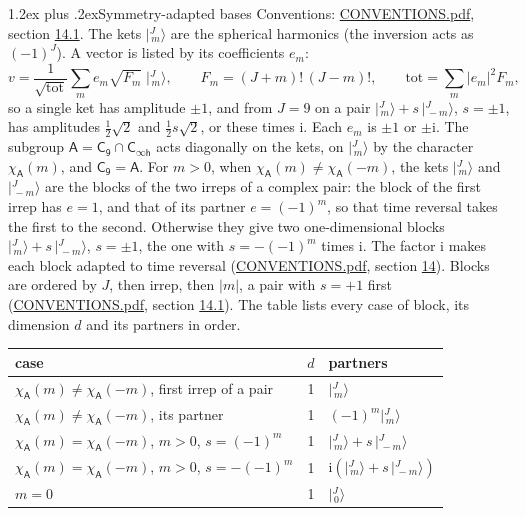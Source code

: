 \documentclass[10pt,a4paper]{article}
\makeatletter
\renewcommand\section{\@startsection{section}{1}{\z@}{-3ex plus -1ex minus -.2ex}%
  {1.2ex plus .2ex}{\normalfont\large\sffamily\bfseries\color{parttitle}}}
\numberwithin{equation}{section}
\newcommand{\grp}[1]{\mathsf{#1}}
\newcommand{\iunit}{\mathrm{i}}
\newcommand{\chiA}{\chi_{\grp{A}}}
\newcommand{\jm}[2]{\bigl\lvert{}^{#1}_{\,#2}\bigr\rangle}
\makeatother
\begin{document}
\section{Symmetry-adapted bases}\label{s:bases}
Conventions: \href{../../CONVENTIONS.pdf}{CONVENTIONS.pdf}, section \href{../../CONVENTIONS.pdf\#conv.14.1}{14.1}.
\leavevmode\label{n:index.m}\label{n:vector.ket}The kets $\jm{J}{m}$ are the spherical harmonics (the inversion acts as $(-1)^J$). \label{n:index.ketcoefficient}\label{n:vector.basis.symmetry}\label{n:index.ketweight}\label{n:index.total}A vector is listed by its coefficients $e_m$:
\begin{equation}\label{e:ket}v = \frac{1}{\sqrt{\mathrm{tot}}}\sum_m e_m\sqrt{F_m}\;\jm{J}{m},\qquad F_m = (J+m)!\,(J-m)!,\qquad \mathrm{tot} = \sum_m |e_m|^2F_m,\end{equation}
\leavevmode\label{n:index.pair.sign}so a single ket has amplitude $\pm1$, and from $J = 9$ on a pair $\jm{J}{m} + s\,\jm{J}{-m}$, $s = \pm1$, has amplitudes $\tfrac{1}{2}\sqrt{2}$ and $\tfrac{1}{2}s\sqrt{2}$, or these times $\iunit$. Each $e_m$ is $\pm1$ or $\pm\iunit$.
\leavevmode\label{n:group.A}\label{n:function.character.abelian}The subgroup $\grp{A} = \grp{C_{9}}\cap\grp{C_{\infty h}}$ acts diagonally on the kets, on $\jm{J}{m}$ by the character $\chiA(m)$, and $\grp{C_{9}} = \grp{A}$. For $m > 0$, when $\chiA(m) \ne \chiA(-m)$, the kets $\jm{J}{m}$ and $\jm{J}{-m}$ are the blocks of the two irreps of a complex pair: the block of the first irrep has $e = 1$, and that of its partner $e = (-1)^m$, so that time reversal takes the first to the second. Otherwise they give two one-dimensional blocks $\jm{J}{m} + s\,\jm{J}{-m}$, $s = \pm1$, the one with $s = -(-1)^m$ times $\iunit$. The factor $\iunit$ makes each block adapted to time reversal (\href{../../CONVENTIONS.pdf}{CONVENTIONS.pdf}, section \href{../../CONVENTIONS.pdf\#conv.14}{14}). Blocks are ordered by $J$, then irrep, then $|m|$, a pair with $s = +1$ first (\href{../../CONVENTIONS.pdf}{CONVENTIONS.pdf}, section \href{../../CONVENTIONS.pdf\#conv.14.1}{14.1}).
\leavevmode\label{n:head.case}\label{n:head.partners}The table lists every case of block, its dimension $d$ and its partners in order.
\begin{center}\begin{tabular}{@{}lrl@{}}\toprule
case & $d$ & partners\\\midrule
$\chiA(m) \ne \chiA(-m)$, first irrep of a pair & 1 & $\jm{J}{m}$\\
$\chiA(m) \ne \chiA(-m)$, its partner & 1 & $(-1)^m\jm{J}{m}$\\
$\chiA(m) = \chiA(-m)$, $m > 0$, $s = (-1)^m$ & 1 & $\jm{J}{m} + s\,\jm{J}{-m}$\\
$\chiA(m) = \chiA(-m)$, $m > 0$, $s = -(-1)^m$ & 1 & $\iunit(\jm{J}{m} + s\,\jm{J}{-m})$\\
$m = 0$ & 1 & $\jm{J}{0}$\\
\bottomrule\end{tabular}\end{center}
\end{document}
